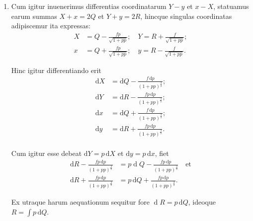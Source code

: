 \documentclass[10pt,a4paper]{article}
\def\D{\mathrm{d}}
\begin{document}
\begin{paracol}{2}
\begin{enumerate}[topsep=1px]
		\switchcolumn*
		
		\item Cum igitur inuenerimus differentias coordinatarum $Y-y$ et $x-X$, statuamus earum summas $X+x= 2Q$ et $Y+y=2R$, hincque singulas coordinatas adipiscemur ita expressas:
		\begin{align*}
			X &= Q - \frac{fp}{\sqrt{1+pp}}; \quad Y = R + \frac{f}{\sqrt{1+pp}};\\
			x &= Q+\frac{fp}{\sqrt{1+pp}}; \quad y= R- \frac{f}{\sqrt{1+pp}}.
		\end{align*}
		\par Hinc igitur differentiando erit
		\begin{align*}
			\D X &= \D Q - \frac{f\,\D p}{(1+pp)^\frac{3}{2}};\\
			\D Y &= \D R-\frac{fp\,\D p}{(1+pp)^\frac{3}{2}};\\
			\D x &= \D Q + \frac{f\,\D p}{(1+pp)^\frac{3}{2}};\\
			\D y &= \D R + \frac{fp\,\D p}{(1+pp)^\frac{3}{2}}.\\
		\end{align*}
		\par Cum igitur esse debeat $\D Y=p\,\D X$ et $\D y=p\,\D x$, fiet
		\begin{align*}
			\D R - \frac{fp\,\D p}{(1+pp)^\frac{3}{2}} &= p\operatorname{d}Q - \frac{fp\, \D p}{(1+pp)^\frac{3}{2}} \quad \text{et}\\
			\D R + \frac{fp\,\D p}{(1+pp)^\frac{3}{2}} &= p\,\D Q + \frac{fp\,\D p}{(1+pp)^\frac{3}{2}}.
	 	\end{align*}
	 	
		\par Ex utraque harum aequationum sequitur fore $\operatorname{d} R = p\,\D  Q$, ideoque $R = \int p \,\D Q$.
		

\end{enumerate}
\end{paracol}
\end{document}
